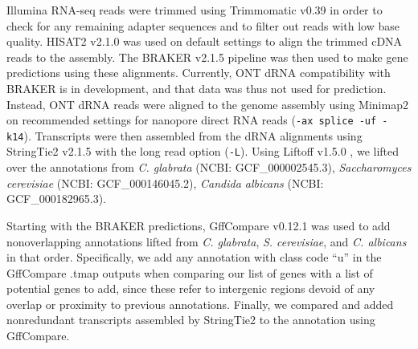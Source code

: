 Illumina RNA-seq reads were trimmed using Trimmomatic v0.39 \citep{Bolger2014-ax} in order to check for any remaining adapter sequences and to filter out reads with low base quality. HISAT2 v2.1.0 was used on default settings to align the trimmed cDNA reads to the assembly. The BRAKER v2.1.5 pipeline \citep{Hoff2019-rd} was then used to make gene predictions using these alignments. Currently, ONT dRNA compatibility with BRAKER is in development, and that data was thus not used for prediction. Instead, ONT dRNA reads were aligned to the genome assembly using Minimap2 on recommended settings for nanopore direct RNA reads (\texttt{-ax splice -uf -k14}). Transcripts were then assembled from the dRNA alignments using StringTie2 v2.1.5 \citep{Kovaka2019-lg} with the long read option (\texttt{-L}). Using Liftoff v1.5.0 \citep{Shumate2020-fo}, we lifted over the annotations from \textit{C. glabrata} (NCBI: GCF\_000002545.3), \textit{Saccharomyces cerevisiae} (NCBI: GCF\_000146045.2), \textit{Candida albicans} (NCBI: GCF\_000182965.3).

Starting with the BRAKER predictions, GffCompare v0.12.1 \citep{Pertea2020-lw} was used to add nonoverlapping annotations lifted from \textit{C. glabrata}, \textit{S. cerevisiae}, and \textit{C. albicans} in that order. Specifically, we add any annotation with class code “u” in the GffCompare .tmap outputs when comparing our list of genes with a list of potential genes to add, since these refer to intergenic regions devoid of any overlap or proximity to previous annotations. Finally, we compared and added nonredundant transcripts assembled by StringTie2 to the annotation using GffCompare.

